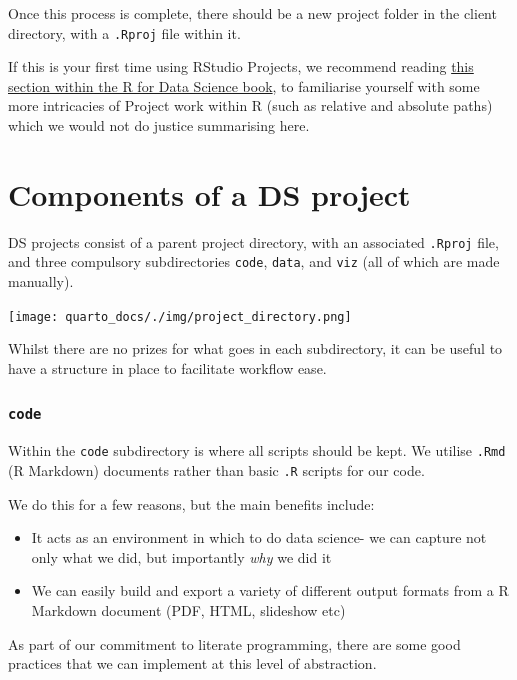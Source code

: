 \documentclass[
  letterpaper,
  DIV=11,
  numbers=noendperiod]{scrreprt}
\providecommand{\tightlist}{%
  \setlength{\itemsep}{0pt}\setlength{\parskip}{0pt}}\usepackage{longtable,booktabs,array}
\begin{document}
Once this process is complete, there should be a new project folder in
the client directory, with a \texttt{.Rproj} file within it.

If this is your first time using RStudio Projects, we recommend reading
\href{https://r4ds.hadley.nz/workflow-scripts.html\#projects}{this
section within the R for Data Science book}, to familiarise yourself
with some more intricacies of Project work within R (such as relative
and absolute paths) which we would not do justice summarising here.

\section{Components of a DS project}\label{components-of-a-ds-project}

DS projects consist of a parent project directory, with an associated
\texttt{.Rproj} file, and three compulsory subdirectories \texttt{code},
\texttt{data}, and \texttt{viz} (all of which are made manually).

\begin{center}
\texttt{[image: quarto\_docs/./img/project\_directory.png]}
\end{center}

Whilst there are no prizes for what goes in each subdirectory, it can be
useful to have a structure in place to facilitate workflow ease.

\subsubsection{\texorpdfstring{\texttt{code}}{code}}\label{code}

Within the \texttt{code} subdirectory is where all scripts should be
kept. We utilise \texttt{.Rmd} (R Markdown) documents rather than basic
\texttt{.R} scripts for our code.

We do this for a few reasons, but the main benefits include:

\begin{itemize}
\tightlist
\item
  It acts as an environment in which to do data science- we can capture
  not only what we did, but importantly \emph{why} we did it
\item
  We can easily build and export a variety of different output formats
  from a R Markdown document (PDF, HTML, slideshow etc)
\end{itemize}

As part of our commitment to literate programming, there are some good
practices that we can implement at this level of abstraction.
\end{document}
